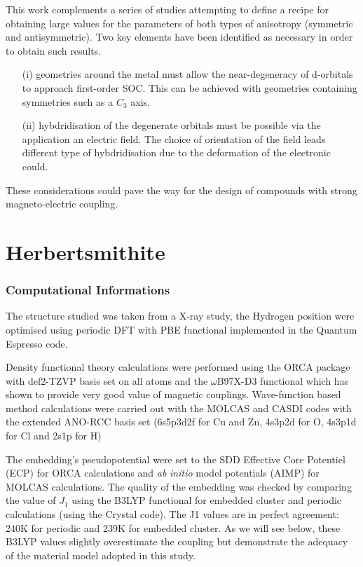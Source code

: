 \documentclass[10pt]{report}
\numberwithin{equation}{section}
\begin{document}
\par This work complements a series of studies attempting to define a recipe for obtaining large values for the parameters of both types of anisotropy (symmetric and antisymmetric).
Two key elements have been identified as necessary in order to obtain such results.
\begin{itemize}
    \item[(i)] geometries around the metal must allow the near-degeneracy of d-orbitals to approach first-order SOC. This can be achieved with geometries containing symmetries such as a $C_3$ axis.
    \item[(ii)] hybdridisation of the degenerate orbitals must be possible via the application an electric field. The choice of orientation of the field leads different type of hybdridisation due to the deformation of the electronic could. 
\end{itemize}
These considerations could pave the way for the design of compounds with strong magneto-electric coupling.


\chapter{Herbertsmithite}


\subsection*{Computational Informations}

The structure studied was taken from a X-ray study, the Hydrogen position were optimised using periodic DFT with PBE functional implemented in the Quantum Espresso code.

Density functional theory calculations were performed using the ORCA package with def2-TZVP basis set on all atoms and the $\omega$B97X-D3 functional which has shown to provide very good value of magnetic couplings.
Wave-function based method calculations were carried out with the MOLCAS and CASDI codes with the extended ANO-RCC basis set (6s5p3d2f for Cu and Zn, 4s3p2d
for O, 4s3p1d for Cl and 2s1p for H)

The embedding's pseudopotential were set to the SDD Effective Core Potentiel (ECP) for ORCA calculations and \textit{ab} \textit{initio} model potentials (AIMP) for MOLCAS calculations. 
The quality of the embedding was checked by comparing the value of $J_1$ using the B3LYP functional for embedded cluster and periodic calculations (using the Crystal code). 
The J1 values are in perfect agreement: 240K for periodic and 239K for embedded cluster. 
As we will see below, these B3LYP values slightly overestimate the coupling but demonstrate the adequacy of the material model adopted in this study.
\end{document}
